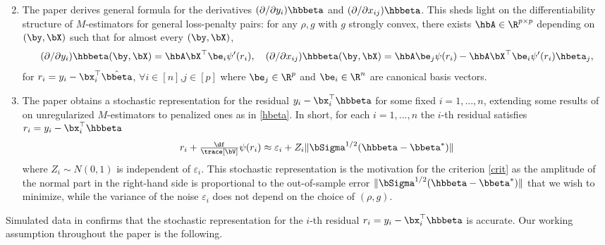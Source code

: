\documentclass{colt2022} %
\def\eps{\varepsilon}
\numberwithin{equation}{section}
\begin{document}
\begin{enumerate}[leftmargin=0.5cm]
    \setcounter{enumi}{1}
    \item 
    The paper derives general formula for the derivatives
    $(\partial/\partial y_i) \hbbeta$ and $(\partial/\partial x_{ij}) \hbbeta$.
    This sheds light on the differentiability structure of $M$-estimators
    for general loss-penalty pairs: for any $\rho,g$ with $g$ strongly convex,
    there exists $\hbA\in\R^{p\times p}$ depending on $(\by,\bX)$ such that
    for almost every $(\by,\bX)$,
    \begin{equation*}
        (\partial/\partial y_i)
        \hbbeta(\by,\bX)
        =  \hbA \bX^\top \be_i \psi'(r_i), 
        \quad
        (\partial/\partial x_{ij})
        \hbbeta(\by,\bX)
        =   \hbA \be_j \psi(r_i)
        - \hbA \bX^\top \be_i \psi'(r_i)  \hbeta_j,
    \end{equation*}
    for $r_i = y_{i} - \bx_{i}^{\top} \hat \bbeta$,
    $\forall i\in[n]$,$j\in[p]$ where $\be_j\in\R^p$ and $\be_i\in\R^n$ are canonical basis vectors.
    \item
    The paper obtains a stochastic representation for the
    residual $y_i - \bx_i^\top\hbbeta$ for some fixed $i=1,...,n$,
    extending some results of \cite{karoui2013robust} on unregularized $M$-estimators to penalized ones as in \eqref{hbeta}.
    In short, for each $i=1,...,n$ the $i$-th residual satisfies $r_i = y_i - \bx_i^\top\hbbeta$
    \begin{equation}
    r_i + \tfrac{\df}{\trace[\bV]} \psi(r_i) \approx 
    \eps_i + Z_i \|\bSigma^{1/2}(\hbbeta-\bbeta^*)\|
    \end{equation}
    where $Z_i\sim N(0,1)$ is independent of $\eps_i$.
    This stochastic representation is the motivation for the criterion
    \eqref{crit} as the amplitude of the normal part
    in the right-hand side
    is proportional to the out-of-sample error 
    $\|\bSigma^{1/2}(\hbbeta-\bbeta^*)\|$ that we wish to minimize,
    while the variance of the noise $\eps_i$ does not depend
    on the choice of $(\rho,g)$.
\end{enumerate}

Simulated data in  confirms that the stochastic representation
for the $i$-th residual $r_i = y_i-\bx_i^\top\hbbeta$ is accurate.
Our working assumption throughout the paper is the following.
\end{document}
